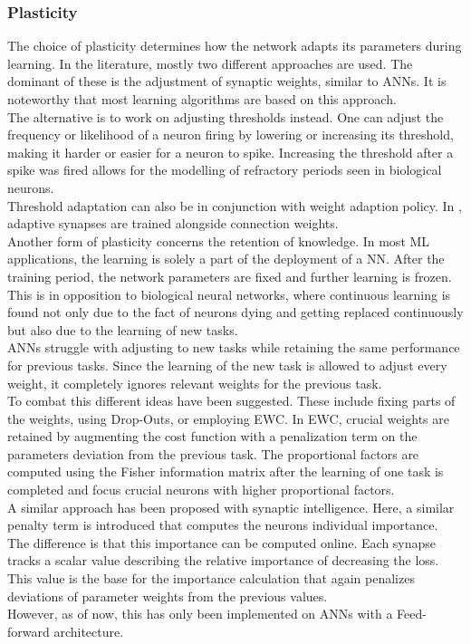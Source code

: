 \subsubsection{Plasticity}\label{sssec:plasticity}
The choice of plasticity determines how the network adapts its parameters during learning. In the literature, mostly two different approaches are used. The dominant of these is the adjustment of synaptic weights, similar to \acp{ANN}. It is noteworthy that most learning algorithms are based on this approach.\\
The alternative is to work on adjusting thresholds instead\cite{chen_adaptive_2022,amin_automated_2021}. One can adjust the frequency or likelihood of a neuron firing by lowering or increasing its threshold, making it harder or easier for a neuron to spike. Increasing the threshold after a spike was fired allows for the modelling of refractory periods seen in biological neurons.\\
Threshold adaptation can also be in conjunction with weight adaption policy. In \cite{sun_synapse-threshold_2023}, adaptive synapses are trained alongside connection weights.\\
Another form of plasticity concerns the retention of knowledge. In most \ac{ML} applications, the learning is solely a part of the deployment of a \ac{NN}. After the training period, the network parameters are fixed and further learning is frozen. This is in opposition to biological neural networks, where continuous learning is found not only due to the fact of neurons dying and getting replaced continuously but also due to the learning of new tasks.\\
\acp{ANN} struggle with adjusting to new tasks while retaining the same performance for previous tasks. Since the learning of the new task is allowed to adjust every weight, it completely ignores relevant weights for the previous task.\\
To combat this different ideas have been suggested. These include fixing parts of the weights, using Drop-Outs, or employing \ac{EWC}\cite{kirkpatrick_overcoming_2017}. In \ac{EWC}, crucial weights are retained by augmenting the cost function with a penalization term on the parameters deviation from the previous task. The proportional factors are computed using the Fisher information matrix after the learning of one task is completed and focus crucial neurons with higher proportional factors.\\
A similar approach has been proposed with synaptic intelligence\cite{zenke_continual_2017}.
Here, a similar penalty term is introduced that computes the neurons individual importance. The difference is that this importance can be computed online. Each synapse tracks a scalar value describing the relative importance of decreasing the loss. This value is the base for the importance calculation that again penalizes deviations of parameter weights from the previous values.\\
However, as of now, this has only been implemented on \acp{ANN} with a Feed-forward architecture.

